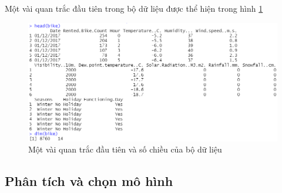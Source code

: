 Một vài quan trắc đầu tiên trong bộ dữ liệu được thể hiện trong hình \ref{A2_head}

\begin{figure}[H]
	\centering
	\includegraphics[width=0.8\linewidth]{../Photo Of Result/A2_head}
	\caption{Một vài quan trắc đầu tiên và số chiều của bộ dữ liệu}
	\label{A2_head}
\end{figure}

\subsection*{Phân tích và chọn mô hình}

